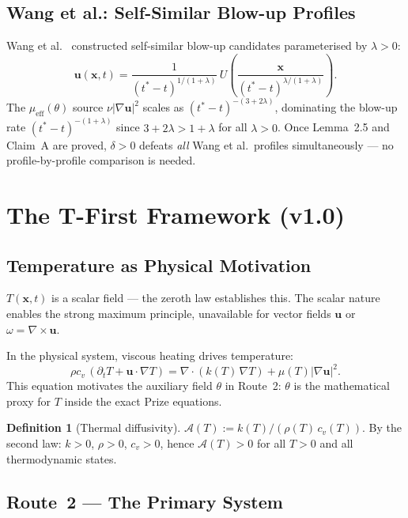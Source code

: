 \documentclass[11pt, a4paper]{article}
\theoremstyle{definition}
\newtheorem{definition}[theorem]{Definition}
\theoremstyle{remark}
\newcommand{\Afield}{\mathcal{A}}
\newcommand{\lam}{\lambda}
\newcommand{\thet}{\theta}
\newcommand{\mueff}{\mu_{\mathrm{eff}}}
\newcommand{\delt}{\delta}
\begin{document}
\subsection{Wang et al.: Self-Similar Blow-up Profiles}

Wang et al.~\cite{wang2025} constructed self-similar blow-up candidates
parameterised by $\lam > 0$:
\[
  \mathbf{u}(\mathbf{x},t) = \frac{1}{(t^*-t)^{1/(1+\lam)}}
  \,U\!\left(\frac{\mathbf{x}}{(t^*-t)^{\lam/(1+\lam)}}\right).
\]
The $\mueff(\thet)$ source $\nu|\nabla\mathbf{u}|^2$ scales as $(t^*-t)^{-(3+2\lam)}$,
dominating the blow-up rate $(t^*-t)^{-(1+\lam)}$ since $3+2\lam > 1+\lam$
for all $\lam > 0$. Once Lemma~2.5 and Claim~A are proved, $\delt > 0$
defeats \emph{all} Wang et al.\ profiles simultaneously --- no profile-by-profile
comparison is needed.

\section{The T-First Framework (v1.0)}

\subsection{Temperature as Physical Motivation}

$T(\mathbf{x},t)$ is a scalar field --- the zeroth law establishes this. The scalar
nature enables the strong maximum principle, unavailable for vector fields $\mathbf{u}$
or $\omega = \nabla\times\mathbf{u}$.

In the physical system, viscous heating drives temperature:
\begin{equation}
  \rho c_v\,(\partial_t T + \mathbf{u}\cdot\nabla T)
    = \nabla\cdot(k(T)\,\nabla T) + \mu(T)|\nabla\mathbf{u}|^2.
  \label{eq:T-physical}
\end{equation}
This equation motivates the auxiliary field $\thet$ in Route~2:
$\thet$ is the mathematical proxy for $T$ inside the exact Prize equations.

\begin{definition}[Thermal diffusivity]
  $\Afield(T) := k(T)/(\rho(T)\,c_v(T))$. By the second law: $k > 0$, $\rho > 0$,
  $c_v > 0$, hence $\Afield(T) > 0$ for all $T > 0$ and all thermodynamic states.
\end{definition}

\subsection{Route~2 --- The Primary System}
\end{document}
